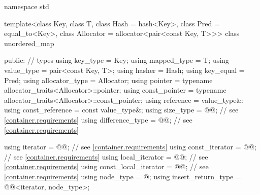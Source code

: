 %
\begin{codeblock}
namespace std {
  template<class Key,
           class T,
           class Hash = hash<Key>,
           class Pred = equal_to<Key>,
           class Allocator = allocator<pair<const Key, T>>>
  class unordered_map {
  public:
    // types
    using key_type             = Key;
    using mapped_type          = T;
    using value_type           = pair<const Key, T>;
    using hasher               = Hash;
    using key_equal            = Pred;
    using allocator_type       = Allocator;
    using pointer              = typename allocator_traits<Allocator>::pointer;
    using const_pointer        = typename allocator_traits<Allocator>::const_pointer;
    using reference            = value_type&;
    using const_reference      = const value_type&;
    using size_type            = @@; // see \ref{container.requirements}
    using difference_type      = @@; // see \ref{container.requirements}

    using iterator             = @@; // see \ref{container.requirements}
    using const_iterator       = @@; // see \ref{container.requirements}
    using local_iterator       = @@; // see \ref{container.requirements}
    using const_local_iterator = @@; // see \ref{container.requirements}
    using node_type            = @\unspec@;
    using insert_return_type   = @@<iterator, node_type>;

}}
\end{codeblock}
